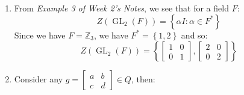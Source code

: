 \documentclass[a4paper, 11pt]{article}
\newcommand{\ZZ}{\mathbb{Z}}
\def\set#1{\left\{ #1 \right\}}
\begin{document}
\begin{enumerate}[label=(\alph*)]








	\item From \textit{Example 3 of Week 2's Notes}, we see that for a field $F$: 
	\[
		Z(\operatorname{GL}_2(F)) = 
		\set{
			\alpha I : \alpha \in F^*
		}
	\] 
	Since we have $F=\ZZ_3$, we have $F^*=\set{1,2}$ and so: 
	\[
		Z(\operatorname{GL}_2(F))=\set{
			\begin{bmatrix}
				1 & 0 \\ 
				0 & 1
			\end{bmatrix},
			\begin{bmatrix}
				2 & 0 \\
				0 & 2 
			\end{bmatrix}
		}
	\]

	\item 
	Consider any $g=\begin{bmatrix}
		a & b\\
		c & d
	\end{bmatrix}\in Q$, then: 
	

\end{enumerate}
\end{document}
